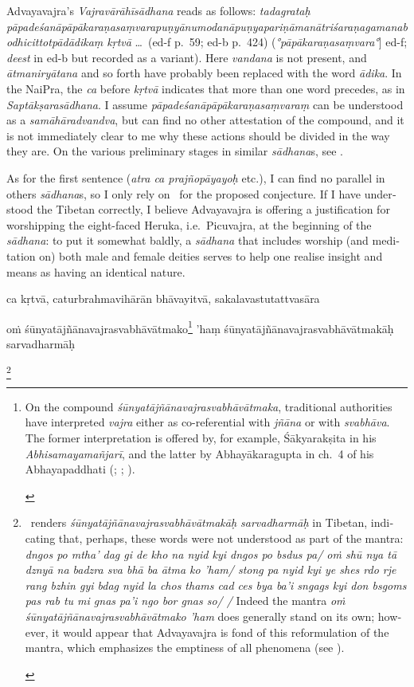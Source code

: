 \documentclass[naipra.tex]{subfiles}
\begin{document}
\begin{sanskrit}
{\begin{english}
		Advayavajra's \emph{Vajravārāhīsādhana} reads as follows: \emph{tadagrataḥ pāpadeśanāpāpākaraṇasaṃvarapuṇyānumodanāpuṇyapariṇāmanātriśaraṇagamanabodhicittotpādādikaṃ kṛtvā} \ldots\ (ed-f p.\ 59; ed-b p.\ 424) (\emph{°pāpākaraṇasaṃvara°}] ed-f; \emph{deest} in ed-b but recorded as a variant).
		Here \emph{vandana} is not present, and \emph{ātmaniryātana} and so forth have probably been replaced with the word \emph{ādika}.
		In the NaiPra, the \emph{ca} before \emph{kṛtvā} indicates that more than one word precedes, as in \emph{Saptākṣarasādhana}.
		I assume \emph{pāpadeśanāpāpākaraṇasaṃvaraṃ} can be understood as a \emph{samāhāradvandva}, but can find no other attestation of the compound, and it is not immediately clear to me why these actions should be divided in the way they are.
		On the various preliminary stages in similar \emph{sādhana}s, see \textcite[122–124]{english2002}.

		As for the first sentence (\emph{atra ca prajñopāyayoḥ} etc.), I can find no parallel in others \emph{sādhana}s, so I only rely on \TIB\ for the proposed conjecture. 
		If I have understood the Tibetan correctly, I believe Advayavajra is offering a justification for worshipping the eight-faced Heruka, i.e.\ Picuvajra, at the beginning of the \emph{sādhana}: to put it somewhat baldly, a \emph{sādhana} that includes worship (and meditation on) both male and female deities serves to help one realise insight and means as having an identical nature.
	\end{english}
}ca kṛtvā, caturbrahmavihārān bhāvayitvā, sakalavastutattvasāra \begin{mantra}oṁ śūnyatājñānavajrasvabhāvātmako\footnote{
	\begin{english}%
		On the compound \emph{śūnyatājñānavajrasvabhāvātmaka}, traditional authorities have interpreted \emph{vajra} either as co-referential with \emph{jñāna} or with \emph{svabhāva}.
		The former interpretation is offered by, for example, Śākyarakṣita in his \emph{Abhisamayamañjarī}, and the latter by Abhayākaragupta in ch.\ 4 of his Abhayapaddhati (\cite[239–40 n.\ 273, n.\ 277]{english2002}; \cite[292]{isaacson2007}; \cite[140, 234]{yang2014}).
	\end{english}
} 'haṃ śūnyatājñānavajrasvabhāvātmakāḥ sarvadharmāḥ\end{mantra}\footnote{
	\begin{english}%
		\TIB\ renders \emph{śūnyatājñānavajrasvabhāvātmakāḥ sarvadharmāḥ} in Tibetan, indicating that, perhaps, these words were not understood as part of the mantra: \emph{dngos po mtha' dag gi de kho na nyid kyi dngos po bsdus pa/ oṁ shū nya tā dznyā na badzra sva bhā ba ātma ko 'ham/ stong pa nyid kyi ye shes rdo rje rang bzhin gyi bdag nyid la chos thams cad ces bya ba'i sngags kyi don bsgoms pas rab tu mi gnas pa'i ngo bor gnas so/ /}
		Indeed the mantra \emph{oṁ śūnyatājñānavajrasvabhāvātmako 'ham} does generally stand on its own; however, it would appear that Advayavajra is fond of this reformulation of the mantra, which emphasizes the emptiness of all phenomena (see \cite[128]{english2002}).


\end{english}}
\end{sanskrit}
\end{document}
